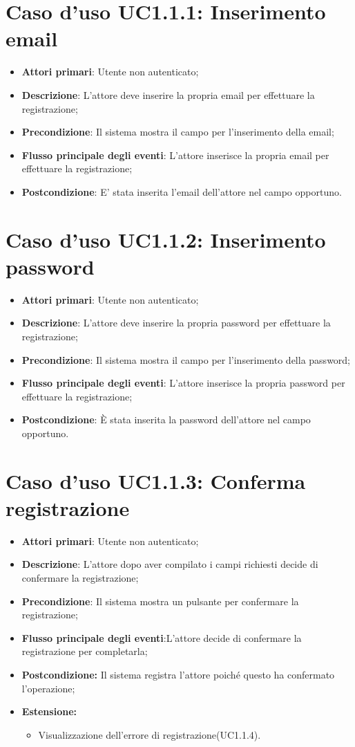 		\section{Caso d'uso UC1.1.1: Inserimento email}
\begin{itemize}
	\item \textbf{Attori primari}: Utente non autenticato;
	\item \textbf{Descrizione}: L'attore deve inserire la propria email per effettuare la  registrazione;
	\item \textbf{Precondizione}: Il sistema mostra il campo per l'inserimento della email;
	\item \textbf{Flusso principale degli eventi}: L'attore inserisce la propria email per effettuare la registrazione;
	\item \textbf{Postcondizione}: E' stata inserita l'email dell'attore nel campo opportuno.
\end{itemize}
\section{Caso d'uso UC1.1.2: Inserimento password}
\begin{itemize}
	\item \textbf{Attori primari}: Utente non autenticato;
	\item \textbf{Descrizione}: L'attore deve inserire la propria password per effettuare la registrazione;
	\item \textbf{Precondizione}: Il sistema mostra il campo per l'inserimento della password;
	\item \textbf{Flusso principale degli eventi}: L'attore inserisce la propria password per effettuare la registrazione;
	\item \textbf{Postcondizione}: È stata inserita la password dell'attore nel campo opportuno.
\end{itemize}

\section{Caso d'uso UC1.1.3: Conferma registrazione}
\begin{itemize}
	\item \textbf{Attori primari}: Utente non autenticato;
	\item \textbf{Descrizione}: L'attore dopo aver compilato i campi richiesti decide di confermare  la registrazione;
	\item \textbf{Precondizione}: Il sistema mostra un pulsante per confermare la registrazione;
	\item \textbf{Flusso principale degli eventi}:L'attore decide di confermare la registrazione per completarla;
	\item \textbf{Postcondizione:} Il sistema registra l'attore poiché questo ha confermato l'operazione;
	\item \textbf{Estensione:}
	\begin{itemize}
		\item Visualizzazione dell'errore di registrazione(UC1.1.4).
	\end{itemize}
\end{itemize}


